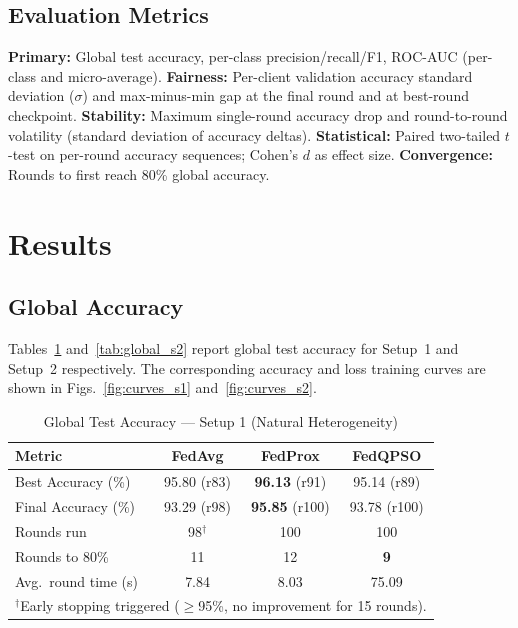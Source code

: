 \documentclass[conference]{IEEEtran}
\begin{document}
\subsection{Evaluation Metrics}
\textbf{Primary:} Global test accuracy, per-class precision/recall/F1,
ROC-AUC (per-class and micro-average).
\textbf{Fairness:} Per-client validation accuracy standard deviation
($\sigma$) and max-minus-min gap at the final round and at best-round
checkpoint.
\textbf{Stability:} Maximum single-round accuracy drop and round-to-round
volatility (standard deviation of accuracy deltas).
\textbf{Statistical:} Paired two-tailed $t$-test on per-round accuracy
sequences; Cohen's $d$ as effect size.
\textbf{Convergence:} Rounds to first reach 80\% global accuracy.

\section{Results}
\label{sec:results}

\subsection{Global Accuracy}

Tables~\ref{tab:global_s1} and~\ref{tab:global_s2} report global test
accuracy for Setup~1 and Setup~2 respectively. The corresponding accuracy
and loss training curves are shown in Figs.~\ref{fig:curves_s1}
and~\ref{fig:curves_s2}.

\begin{table}[htbp]
\caption{Global Test Accuracy --- Setup 1 (Natural Heterogeneity)}
\label{tab:global_s1}
\begin{center}
\begin{tabular}{lccc}
\hline
\textbf{Metric} & \textbf{FedAvg} & \textbf{FedProx} & \textbf{FedQPSO}\\
\hline
Best Accuracy (\%)     & 95.80 (r83) & \textbf{96.13} (r91) & 95.14 (r89)\\
Final Accuracy (\%)    & 93.29 (r98) & \textbf{95.85} (r100) & 93.78 (r100)\\
Rounds run             & 98$^\dagger$ & 100 & 100\\
Rounds to 80\%         & 11 & 12 & \textbf{9}\\
Avg.\ round time (s)   & 7.84 & 8.03 & 75.09\\
\hline
\multicolumn{4}{l}{\small $^\dagger$Early stopping triggered ($\geq$95\%,
no improvement for 15 rounds).}
\end{tabular}
\end{center}
\end{table}
\end{document}
